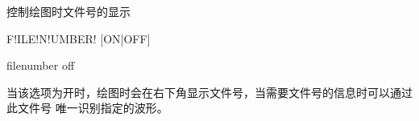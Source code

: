\label{cmd:filenumber}

控制绘图时文件号的显示

\begin{SACSTX}
F!ILE!N!UMBER! [ON|OFF]
\end{SACSTX}

\begin{SACDFT}
filenumber off
\end{SACDFT}

当该选项为开时，绘图时会在右下角显示文件号，当需要文件号的信息时可以通过此文件号
唯一识别指定的波形。
